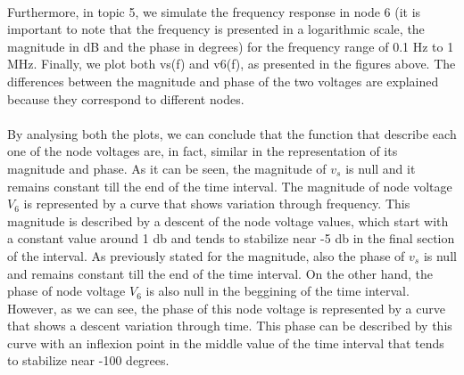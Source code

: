\paragraph{}
Furthermore, in topic 5, we simulate the frequency response in node 6 (it is important to note that the frequency is presented in a logarithmic scale, the magnitude in dB and the phase in degrees) for the frequency range of 0.1 Hz to 1 MHz. Finally, we plot both vs(f) and v6(f), as presented in the figures above. The differences between the magnitude and phase of the two voltages are explained because they correspond to different nodes.

\paragraph{}
By analysing both the plots, we can conclude that the function that describe each one of the node voltages are, in fact, similar in the representation of its magnitude and phase. As it can be seen, the magnitude of $v_s$ is null and it remains constant till the end of the time interval. The magnitude of node voltage $V_6$ is represented by a curve that shows variation through frequency. This magnitude is described by a descent of the node voltage values, which start with a constant value around 1 db and tends to stabilize near -5 db in the final section of the interval. As previously stated for the magnitude, also the phase of $v_s$ is null and remains constant till the end of the time interval. On the other hand, the phase of node voltage $V_6$ is also null in the beggining of the time interval. However, as we can see, the phase of this node voltage is represented by a curve that shows a descent variation through time. This phase can be described by this curve with an inflexion point in the middle value of the time interval that tends to stabilize near -100 degrees.

